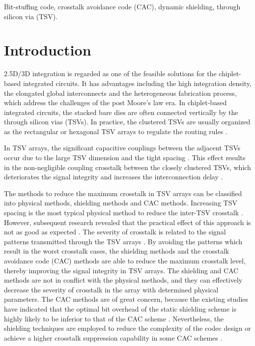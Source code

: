 \documentclass[lettersize,journal]{IEEEtran}
\begin{document}
\begin{IEEEkeywords}
Bit-stuffing code, crosstalk avoidance code (CAC), dynamic shielding, through silicon via (TSV).
\end{IEEEkeywords}

\section{Introduction}\label{sec-intro}
 2.5D/3D integration is regarded as one of the feasible solutions for the chiplet-based integrated circuits. It has advantages including the high integration density, the elongated global interconnects and the heterogeneous fabrication process, which address the challenges of the post Moore’s law era. In chiplet-based integrated circuits, the stacked bare dies are often connected vertically by the through silicon vias (TSVs). In practice, the clustered TSVs are usually organized as the rectangular or hexagonal TSV arrays to regulate the routing rules \cite{A04_Vaisband_7448908}.

In TSV arrays, the significant capacitive couplings between the adjacent TSVs occur due to the large TSV dimension and the tight spacing \cite{A05_Kumar_6513784}. This effect results in the non-negligible coupling crosstalk between the closely clustered TSVs, which deteriorates the signal integrity and increases the interconnection delay \cite{A07_Song_7273940}. 

The methods to reduce the maximum crosstalk in TSV arrays can be classified into physical methods, shielding methods and CAC methods. Increasing TSV spacing is the most typical physical method to reduce the inter-TSV crosstalk \cite{A09_Kim_5699376}. However, subsequent research revealed that the practical effect of this approach is not as good as expected \cite{A07_Song_7273940}. The severity of crosstalk is related to the signal patterns transmitted through the TSV arrays \cite{A05_Kumar_6513784,A07_Song_7273940,A10_Cui_7851080,A11_Cui_9509749}. By avoiding the patterns which result in the worst crosstalk cases, the shielding methods \cite{A12_Hu_7517149,A13_Mei_8480511,A14_Cui_8480772,A15_Chang_6509678} and the crosstalk avoidance code (CAC) methods \cite{A05_Kumar_6513784,A10_Cui_7851080,A11_Cui_9509749,A16_Wu_5395631,A17_Shirmohammadi_6675266,A18_Shirmohammadi_7780349,A19_Zou_6742982,A20_Ran_7588317,A21_Wei_10224770,A22_Wei_9796564} are able to reduce the maximum crosstalk level, thereby improving the signal integrity in TSV arrays. The shielding and CAC methods are not in conflict with the physical methods, and they can effectively decrease the severity of crosstalk in the array with determined physical parameters. The CAC methods are of great concern, because the existing studies have indicated that the optimal bit overhead of the static shielding scheme is highly likely to be inferior to that of the CAC scheme \cite{A14_Cui_8480772,A23_Luo_8126413}. Nevertheless, the shielding techniques are employed to reduce the complexity of the codec design or achieve a higher crosstalk suppression capability in some CAC schemes \cite{A11_Cui_9509749,A20_Ran_7588317}.
\end{document}

